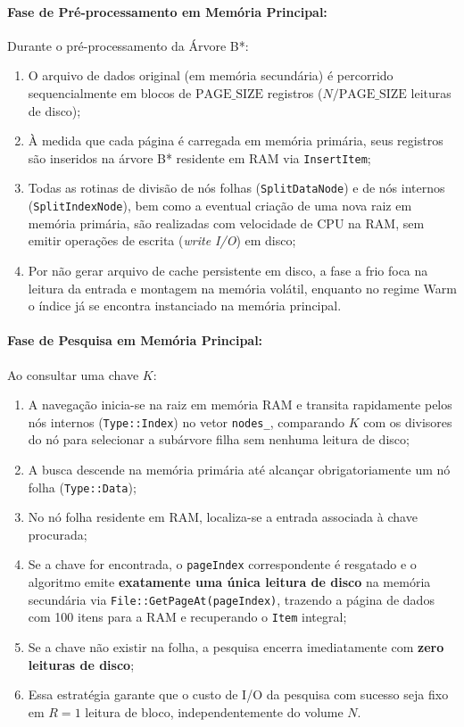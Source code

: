 \documentclass[12pt,a4paper]{article}
\begin{document}
\paragraph{Fase de Pré-processamento em Memória Principal:}
Durante o pré-processamento da Árvore B*:
\begin{enumerate}
    \item O arquivo de dados original (em memória secundária) é percorrido sequencialmente em blocos de $\text{PAGE\_SIZE}$ registros ($N / \text{PAGE\_SIZE}$ leituras de disco);
    \item À medida que cada página é carregada em memória primária, seus registros são inseridos na árvore B* residente em RAM via \texttt{InsertItem};
    \item Todas as rotinas de divisão de nós folhas (\texttt{SplitDataNode}) e de nós internos (\texttt{SplitIndexNode}), bem como a eventual criação de uma nova raiz em memória primária, são realizadas com velocidade de CPU na RAM, sem emitir operações de escrita (\textit{write I/O}) em disco;
    \item Por não gerar arquivo de cache persistente em disco, a fase a frio foca na leitura da entrada e montagem na memória volátil, enquanto no regime Warm o índice já se encontra instanciado na memória principal.
\end{enumerate}

\paragraph{Fase de Pesquisa em Memória Principal:}
Ao consultar uma chave $K$:
\begin{enumerate}
    \item A navegação inicia-se na raiz em memória RAM e transita rapidamente pelos nós internos (\texttt{Type::Index}) no vetor \texttt{nodes\_}, comparando $K$ com os divisores do nó para selecionar a subárvore filha sem nenhuma leitura de disco;
    \item A busca descende na memória primária até alcançar obrigatoriamente um nó folha (\texttt{Type::Data});
    \item No nó folha residente em RAM, localiza-se a entrada associada à chave procurada;
    \item Se a chave for encontrada, o \texttt{pageIndex} correspondente é resgatado e o algoritmo emite \textbf{exatamente uma única leitura de disco} na memória secundária via \texttt{File::GetPageAt(pageIndex)}, trazendo a página de dados com 100 itens para a RAM e recuperando o \texttt{Item} integral;
    \item Se a chave não existir na folha, a pesquisa encerra imediatamente com \textbf{zero leituras de disco};
    \item Essa estratégia garante que o custo de I/O da pesquisa com sucesso seja fixo em $R = 1$ leitura de bloco, independentemente do volume $N$.
\end{enumerate}
\end{document}
